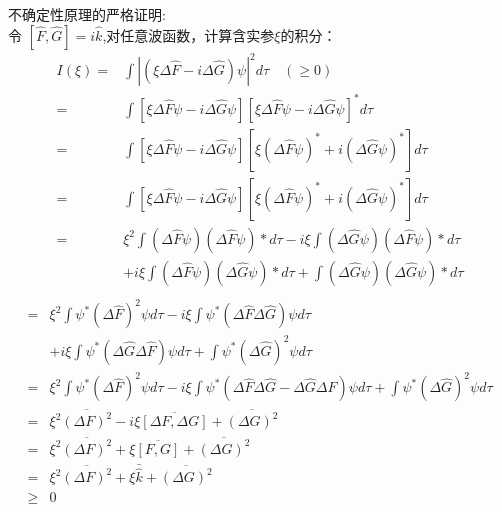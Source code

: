\begin{frame} [allowframebreaks=]
    \frametitle{}
    \alert{不确定性原理的严格证明:} \\
    令 $[\hat{F}, \hat{G}]= i\hat{k}$,对任意波函数，计算含实参$\xi$的积分：
    $$
    \begin{aligned}
    I(\xi)= &\int|(\xi\Delta \hat{F}-i \Delta \hat{G}) \psi|^{2} d \tau \quad (\geq 0) \\
    =&\int[\xi \Delta \hat{F} \psi-i \Delta \hat{G} \psi][\xi \Delta \hat{F} \psi-i \Delta \hat{G} \psi]^{*} d \tau \\
    =&\int[\xi \Delta \hat{F} \psi-i \Delta \hat{G} \psi] [\xi(\Delta \hat{F} \psi)^{*}+i(\Delta \hat{G} \psi)^{*}] d \tau \\
    =&\int[\xi \Delta \hat{F} \psi-i \Delta \hat{G} \psi]\left[\xi(\Delta \hat{F} \psi)^{*}+i(\Delta \hat{G} \psi)^{*}\right] d \tau \\
    =& \xi^{2} \int(\Delta \hat{F} \psi)(\Delta \hat{F} \psi) * d \tau-i \xi \int(\Delta \hat{G} \psi)(\Delta \hat{F} \psi) * d \tau \\
        &+i \xi \int(\Delta \hat{F} \psi)(\Delta \hat{G} \psi) * d \tau+\int(\Delta \hat{G} \psi)(\Delta \hat{G} \psi) * d \tau \\
    \end{aligned}
    $$
    $$
    \begin{aligned}
    =& \xi^{2} \int \psi^{*}(\Delta \hat{F})^{2} \psi d \tau-i \xi \int \psi^{*}(\Delta \hat{F} \Delta \hat{G}) \psi d \tau \\
    &+i \xi \int \psi^{*}(\Delta \hat{G} \Delta \hat{F}) \psi d \tau+\int \psi^{*}(\Delta \hat{G})^{2} \psi d \tau \\
    =& \xi^{2} \int \psi^{*}(\Delta \hat{F})^{2} \psi d \tau-i \xi \int \psi^{*}(\Delta \hat{F} \Delta \hat{G}-\Delta \hat{G} \Delta \hat{F}) \psi d \tau+\int \psi^{*}(\Delta \hat{G})^{2} \psi d \tau \\
    =& \xi^{2} \overline{(\Delta F)^{2}}-i \xi \overline{[\Delta F, \Delta G]}+\overline{(\Delta G)^{2}}\\
    =&\xi^{2} \overline{(\Delta F)^{2}}+\xi \overline{[F, G]}+\overline{(\Delta G)^{2}} \\
    =&\xi^{2} \overline{(\Delta F)^{2}}+\xi \bar{\hat{k}}+\overline{(\Delta G)^{2}} \\
    \geq & 0\\
    \end{aligned}
    $$
\end{frame} 

